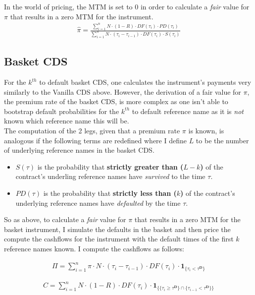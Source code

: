 \documentclass{report}
\theoremstyle{plain}
\theoremstyle{definition}
\begin{document}
In the world of pricing, the MTM is set to 0 in order to calculate a \textit{fair} value for $\pi$ that results in a zero MTM for the instrument. 
\begin{align*}
\hat{\pi} = \frac{\sum_{i=1}^{n} N \cdot (1-R) \cdot DF(\tau_i) \cdot PD(\tau_i)}{\sum_{i=1}^{n} N \cdot (\tau_i - \tau_{i-1}) \cdot DF(\tau_i) \cdot S(\tau_i)}
\end{align*}

\subsection{Basket CDS}
For the $k^{th}$ to default basket CDS, one calculates the instrument's payments very similarly to the Vanilla CDS above. However, the derivation of a fair value for $\pi$, the premium rate of the basket CDS, is more complex as one isn't able to bootstrap default probabilities for the $k^{th}$ to default reference name as it is \emph{not} known which reference name this will be.\\

The computation of the 2 legs, given that a premium rate $\pi$ is known, is analogous if the following terms are redefined where I define $L$ to be the number of underlying reference names in the basket CDS.

\begin{itemize}
	\item $S(\tau)$ is the probability that \textbf{strictly greater than ($L - k$)} of the contract's underling reference names have \emph{survived} to the time $\tau$.
	\item $PD(\tau)$ is the probability that \textbf{strictly less than ($k$)} of the contract's underlying reference names have \emph{defaulted} by the time $\tau$.
\end{itemize}

So as above, to calculate a \textit{fair} value for $\pi$ that results in a zero MTM for the basket instrument, I simulate the defaults in the basket and then price the compute the cashflows for the instrument with the default times of the first $k$ reference names known. I compute the cashflows as follows:

\begin{align*}
\Pi = \sum_{i=1}^{n}\pi \cdot N \cdot (\tau_i - \tau_{i-1}) \cdot DF(\tau_i) \cdot \mathbf{1}_{\{\tau_i < \tau^{\mathbf{D}} \}}
\end{align*}

\begin{align*}
C = \sum_{i=1}^{n} N \cdot (1-R) \cdot DF(\tau_i) \cdot \mathbf{1}_{\{\{\tau_i \geq \tau^{\mathbf{D}}\} \cap \{\tau_{i-1} < \tau^{\mathbf{D}} \}\}}
\end{align*}
\end{document}
